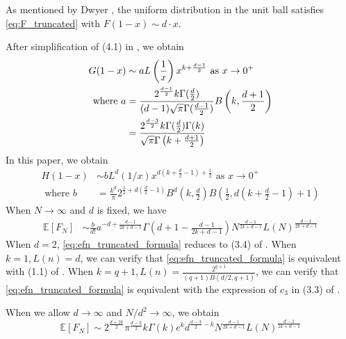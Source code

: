 \documentclass{aptpub}
\def\E{\mathbb{E}}
\begin{document}
As mentioned by Dwyer \cite{dwyer1991convex}, the uniform distribution
in the unit ball satisfies \eqref{eq:F_truncated} with
$F(1-x) \sim d\cdot x$.

After simplification of (4.1) in \cite{dwyer1991convex}, we obtain
\begin{align}
    G(1-x) &\sim a
    L\left(\frac{1}{x} \right)
    x^{k+\frac{d-1}{2}} \textrm{ as } x \to 0^+ 
    \label{eq:truncated_G_1_x}\\
    \textrm{ where } a &=\frac{2^{\frac{d-1}{2}} k \Gamma(\frac{d}{2})}
    {(d-1) \sqrt{\pi} \Gamma(\frac{d-1}{2})}
    B\left(k, \frac{d+1}{2}\right) \notag \\
    &= \frac{2^{\frac{d-3}{2}} k \Gamma(\frac{d}{2})\Gamma(k)}
    {\sqrt{\pi} \Gamma\left(k+\frac{d+1}{2}\right)}
    \label{eq:a}
\end{align}
In this paper, we obtain
\begin{align}
     H(1-x)  & \sim b
     L^d(1/x) x^{d(k+\frac{d}{2}-1)+\frac{1}{2}} 
     \textrm{ as } x \to 0^+ \label{eq:truncated_H_1_x}\\
     \textrm{ where } b &=  \frac{k^d}{\pi}
     2^{\frac{1}{2} + d(\frac{d}{2}-1)} B^d(k, \frac{d}{2})
     B\left( \frac{1}{2},
     d(k+\frac{d}{2} -1)+1 \right)
     \label{eq:b}
 \end{align}
When $N\to \infty$ and $d$ is fixed, we have
 \begin{align}\label{eq:efn_truncated_formula}
     \E[F_N] &\sim \frac{b}{d!}a^{-d+\frac{d-1}{2k+d-1}}
     \Gamma 
     \left(d+1-\frac{d-1}{2k+d-1}\right)
     N^{\frac{d-1}{2k+d-1}}
     L(N)
     ^{\frac{d-1}{2k+d-1}}
 \end{align}
 When $d=2$, \eqref{eq:efn_truncated_formula} reduces to (3.4) of \cite{carnal1970konvexe}.
 When $k=1, L(n)=d$, we can verify that
 \eqref{eq:efn_truncated_formula} is equivalent with (1.1)
 of \cite{raynaud1970enveloppe}.
 When $k=q+1, L(n)=\frac{2^{q+1}}{(q+1)B(d/2,q+1)}$,
 we can verify that
 \eqref{eq:efn_truncated_formula} is equivalent with the expression of $c_3$
 in (3.3) of \cite{affentranger1991convex}.

 When we allow $d\to \infty$ and $N/d^2 \to \infty$, we obtain
 \begin{equation}\label{eq:truncated_d_inf}
  \E[F_N] \sim 2^{\frac{d+2k}{2}}\pi^{\frac{d-2}{2}} k\Gamma(k)e^k d^{\frac{d-3}{2}-k}
  N^{\frac{d-1}{2k+d-1}} L(N)^{\frac{d-1}{2k+d-1}}
 \end{equation}
\end{document}
